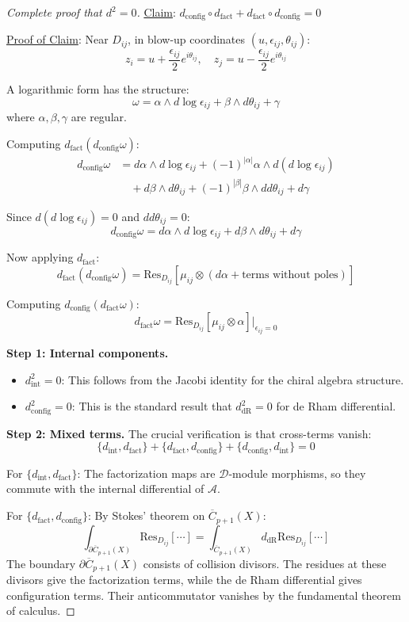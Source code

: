 \begin{proof}[Complete proof that $d^2 = 0$]
\underline{Claim}: $d_{\text{config}} \circ d_{\text{fact}} + d_{\text{fact}} \circ d_{\text{config}} = 0$

\underline{Proof of Claim}: 
Near $D_{ij}$, in blow-up coordinates $(u, \epsilon_{ij}, \theta_{ij})$:
$$z_i = u + \frac{\epsilon_{ij}}{2}e^{i\theta_{ij}}, \quad z_j = u - \frac{\epsilon_{ij}}{2}e^{i\theta_{ij}}$$

A logarithmic form has the structure:
$$\omega = \alpha \wedge d\log\epsilon_{ij} + \beta \wedge d\theta_{ij} + \gamma$$
where $\alpha, \beta, \gamma$ are regular.

Computing $d_{\text{fact}}(d_{\text{config}}\omega)$:
\begin{align}
d_{\text{config}}\omega &= d\alpha \wedge d\log\epsilon_{ij} + (-1)^{|\alpha|}\alpha \wedge d(d\log\epsilon_{ij}) \\
&\quad + d\beta \wedge d\theta_{ij} + (-1)^{|\beta|}\beta \wedge dd\theta_{ij} + d\gamma
\end{align}

Since $d(d\log\epsilon_{ij}) = 0$ and $dd\theta_{ij} = 0$:
$$d_{\text{config}}\omega = d\alpha \wedge d\log\epsilon_{ij} + d\beta \wedge d\theta_{ij} + d\gamma$$

Now applying $d_{\text{fact}}$:
$$d_{\text{fact}}(d_{\text{config}}\omega) = \text{Res}_{D_{ij}}[\mu_{ij} \otimes (d\alpha + \text{terms without poles})]$$

Computing $d_{\text{config}}(d_{\text{fact}}\omega)$:
$$d_{\text{fact}}\omega = \text{Res}_{D_{ij}}[\mu_{ij} \otimes \alpha]|_{\epsilon_{ij}=0}$$

\textbf{Step 1: Internal components.}
\begin{itemize}
\item $d_{\text{int}}^2 = 0$: This follows from the Jacobi identity for the chiral algebra structure.
\item $d_{\text{config}}^2 = 0$: This is the standard result that $d_{\text{dR}}^2 = 0$ for de Rham differential.
\end{itemize}

\textbf{Step 2: Mixed terms.}
The crucial verification is that cross-terms vanish:
\[
\{d_{\text{int}}, d_{\text{fact}}\} + \{d_{\text{fact}}, d_{\text{config}}\} + \{d_{\text{config}}, d_{\text{int}}\} = 0
\]

For $\{d_{\text{int}}, d_{\text{fact}}\}$:
The factorization maps are $\mathcal{D}$-module morphisms, so they commute with the internal differential of $\mathcal{A}$.

For $\{d_{\text{fact}}, d_{\text{config}}\}$:
By Stokes' theorem on $\overline{C}_{p+1}(X)$:
\[
\int_{\partial \overline{C}_{p+1}(X)} \text{Res}_{D_{ij}}[\cdots] = \int_{\overline{C}_{p+1}(X)} d_{\text{dR}} \text{Res}_{D_{ij}}[\cdots]
\]
The boundary $\partial \overline{C}_{p+1}(X)$ consists of collision divisors. The residues at these divisors give the factorization terms, while the de Rham differential gives configuration terms. Their anticommutator vanishes by the fundamental theorem of calculus.


\end{proof}
